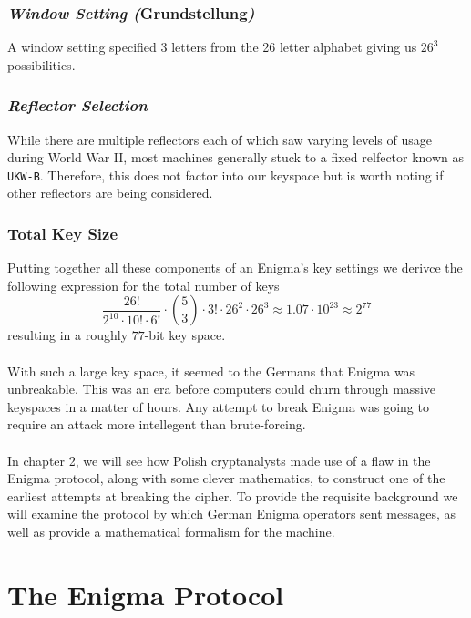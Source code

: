\subsubsection{\emph{Window Setting (}Grundstellung\emph{)}}
A window setting specified 3 letters from the 26 letter alphabet
giving us $26^3$ possibilities.

\subsubsection{\emph{Reflector Selection}}
While there are multiple reflectors each of which saw varying levels
of usage during World War II, most machines generally stuck to a
fixed relfector known as \texttt{UKW-B}. Therefore, this does not
factor into our keyspace but is worth noting if other reflectors are
being considered.

\subsubsection{Total Key Size}
Putting together all these components of an Enigma's key settings we
derivce the following expression for the total number of keys
\[
	\frac{26!}{2^{10}\cdot 10! \cdot 6!}\cdot{5\choose 3}\cdot3!\cdot
	26^2\cdot 26^3 \approx 1.07 \cdot 10^{23} \approx 2^{77}
\]
resulting in a roughly $77$-bit key space.
\\\\With such a large key space, it seemed to the Germans that Enigma
was unbreakable. This was an era before computers could churn through
massive keyspaces in a matter of hours. Any attempt to break Enigma
was going to require an attack more intellegent than brute-forcing.
\\\\In chapter 2, we will see how Polish cryptanalysts made use of a
flaw in the Enigma protocol, along with some clever mathematics, to
construct one of the earliest attempts at breaking the cipher. To
provide the requisite background we will examine the protocol by
which German Enigma operators sent messages, as well as provide a
mathematical formalism for the machine.

\section{The Enigma Protocol}

